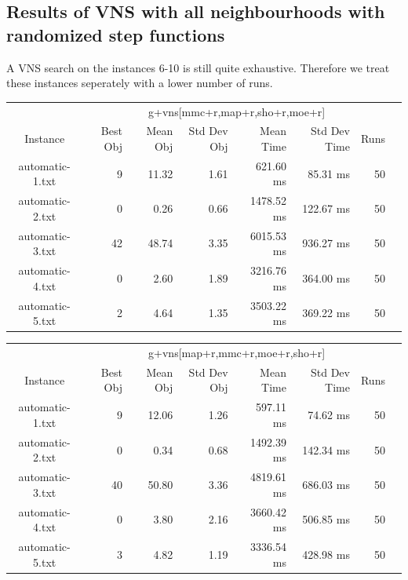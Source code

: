 \documentclass[11pt]{article}
\begin{document}
\subsection{Results of VNS with all neighbourhoods with randomized step functions}
{
A VNS search on the instances 6-10 is still quite exhaustive.
Therefore we treat these instances seperately with a lower number of runs.
\center
\begin{tabular}{c|rrrrrrr}
                & \multicolumn{6}{c}{g+vns[mmc+r,map+r,sho+r,moe+r]}                   \\
Instance        & Best Obj & Mean Obj & Std Dev Obj & Mean Time  & Std Dev Time & Runs \\
\hline
automatic-1.txt & 9        & 11.32    & 1.61        & 621.60 ms  & 85.31 ms     & 50 \\
automatic-2.txt & 0        & 0.26     & 0.66        & 1478.52 ms & 122.67 ms    & 50 \\
automatic-3.txt & 42       & 48.74    & 3.35        & 6015.53 ms & 936.27 ms    & 50 \\
automatic-4.txt & 0        & 2.60     & 1.89        & 3216.76 ms & 364.00 ms    & 50 \\
automatic-5.txt & 2        & 4.64     & 1.35        & 3503.22 ms & 369.22 ms    & 50 \\
\end{tabular}

\begin{tabular}{c|rrrrrrr}
                & \multicolumn{6}{c}{g+vns[map+r,mmc+r,moe+r,sho+r]}                   \\
Instance        & Best Obj & Mean Obj & Std Dev Obj & Mean Time  & Std Dev Time & Runs \\
\hline
automatic-1.txt & 9        & 12.06    & 1.26        & 597.11 ms  & 74.62 ms     & 50 \\
automatic-2.txt & 0        & 0.34     & 0.68        & 1492.39 ms & 142.34 ms    & 50 \\
automatic-3.txt & 40       & 50.80    & 3.36        & 4819.61 ms & 686.03 ms    & 50 \\
automatic-4.txt & 0        & 3.80     & 2.16        & 3660.42 ms & 506.85 ms    & 50 \\
automatic-5.txt & 3        & 4.82     & 1.19        & 3336.54 ms & 428.98 ms    & 50 \\
\end{tabular}

\vspace{0.5cm}

}
\end{document}
